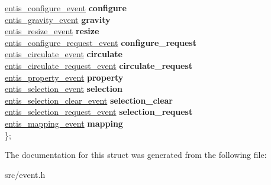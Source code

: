 \begin{DoxyCompactItemize}
\begin{tabbing}
\>\hyperlink{structentis__configure__event}{entis\_configure\_event} {\bfseries configure}\\
\>\hyperlink{structentis__gravity__event}{entis\_gravity\_event} {\bfseries gravity}\\
\>\hyperlink{structentis__resize__event}{entis\_resize\_event} {\bfseries resize}\\
\>\hyperlink{structentis__configure__request__event}{entis\_configure\_request\_event} {\bfseries configure\_request}\\
\>\hyperlink{structentis__circulate__event}{entis\_circulate\_event} {\bfseries circulate}\\
\>\hyperlink{structentis__circulate__request__event}{entis\_circulate\_request\_event} {\bfseries circulate\_request}\\
\>\hyperlink{structentis__property__event}{entis\_property\_event} {\bfseries property}\\
\>\hyperlink{structentis__selection__event}{entis\_selection\_event} {\bfseries selection}\\
\>\hyperlink{structentis__selection__clear__event}{entis\_selection\_clear\_event} {\bfseries selection\_clear}\\
\>\hyperlink{structentis__selection__request__event}{entis\_selection\_request\_event} {\bfseries selection\_request}\\
\>\hyperlink{structentis__mapping__event}{entis\_mapping\_event} {\bfseries mapping}\\
\}; \\

\end{tabbing}\end{DoxyCompactItemize}


The documentation for this struct was generated from the following file\+:\begin{DoxyCompactItemize}
\item 
src/event.\+h\end{DoxyCompactItemize}
